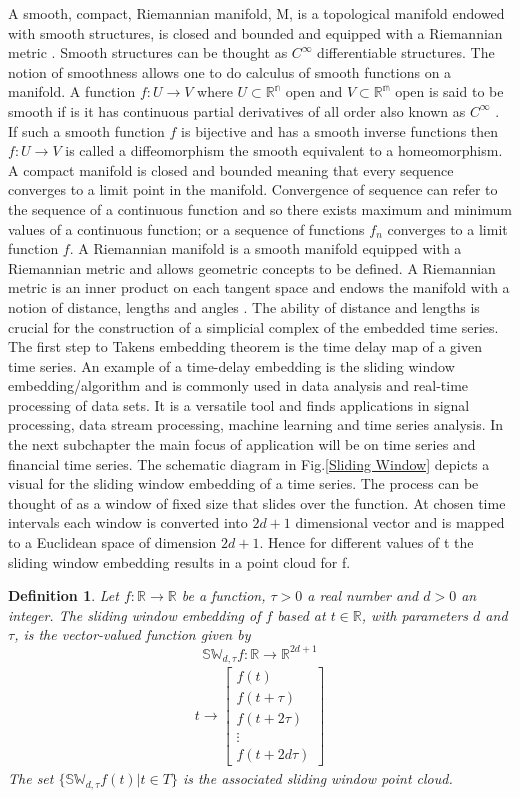 \documentclass{article}
\newcommand{\be}{\begin{equation}}
\newcommand{\ee}{\end{equation}}
\newtheorem{definition}[theorem]{Definition}
\begin{document}
A smooth, compact, Riemannian manifold, M, is a topological manifold endowed with smooth structures, is closed and bounded and equipped with a Riemannian metric \cite{smoothmanifoldLee}. Smooth structures can be thought as $C^{\infty}$ differentiable structures. The notion of smoothness allows one to do calculus of smooth functions on a manifold. A function $f : U \to V $ where $U \subset \mathbb{R^n}$ open and $V \subset \mathbb{R^m}$ open is said to be smooth if is it has continuous partial derivatives of all order also known as $C^{\infty}$ \cite{smoothmanifoldLee}. If such a smooth function $f$ is bijective and has a smooth inverse functions then $f: U \to V$ is called a diffeomorphism the smooth equivalent to a homeomorphism. A compact manifold is closed and bounded meaning that every sequence converges to a limit point in the manifold. Convergence of sequence can refer to the sequence of a continuous function and so there exists maximum and minimum values of a continuous function; or a sequence of functions $f_n$ converges to a limit function $f$. A Riemannian manifold is a smooth manifold equipped with a Riemannian metric and allows geometric concepts to be defined. A Riemannian metric is an inner product on each tangent space and endows the manifold with a notion of distance, lengths and angles \cite{smoothmanifoldLee}. The ability of distance and lengths is crucial for the construction of a simplicial complex of the embedded time series. The first step to Takens embedding theorem is the time delay map of a given time series. 
An example of a time-delay embedding is the sliding window embedding/algorithm and is commonly used in data analysis and real-time processing of data sets. It is a versatile tool and finds applications in signal processing, data stream processing, machine learning and time series analysis. In the next subchapter the main focus of application will be on  time series and financial time series.
The schematic diagram in Fig.\ref{Sliding Window} depicts a visual for the sliding window embedding of a time series. The process can be thought of as a window of fixed size that slides over the function. At chosen time intervals each window is converted into $2d+1$ dimensional vector and is mapped to a Euclidean space of dimension $2d +1$. Hence for different values of t the sliding window embedding results in a point cloud for f.
\begin{definition} Let $f:\mathbb{R} \to \mathbb{R}$ be a function, $\tau > 0$ a real number and $d>0$ an integer. The sliding window embedding of $f$ based at $t \in \mathbb{R}$, with parameters $d$ and $\tau$, is the vector-valued function given by
\be
\mathbb{SW}_{d,\tau} f : \mathbb{R} \to \mathbb{R}^{2d+1}
\ee
\begin{align}t \rightarrow \begin{bmatrix} f(t)\\ f(t + \tau)\\ f(t+2\tau)\\ \vdots\\
f(t+2d\tau)
\end{bmatrix}
\end{align}
The set $\{\mathbb{SW}_{d,\tau} f(t) | t \in T\}$ is the associated sliding window point cloud.
\end{definition}
\end{document}
